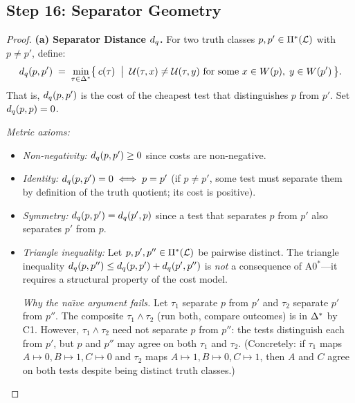 
\subsection{Step 16: Separator Geometry}\label{app:step16}

\begin{proof}
\textbf{(a) Separator Distance $d_q$.}
For two truth classes $p, p' \in \Pi^*(\mathcal{L})$ with $p \neq p'$, define:
\[
  d_q(p, p') \;=\; \min_{\tau \in \Delta^*}
    \bigl\{\, c(\tau) \;\bigm|\; \mathcal{U}(\tau, x) \neq \mathcal{U}(\tau, y)
      \text{ for some } x \in W(p),\; y \in W(p') \,\bigr\}.
\]
That is, $d_q(p, p')$ is the cost of the cheapest test that
distinguishes $p$ from $p'$.  Set $d_q(p, p) = 0$.

\emph{Metric axioms:}
\begin{itemize}[nosep]
  \item \emph{Non-negativity:} $d_q(p, p') \geq 0$ since costs are
        non-negative.
  \item \emph{Identity:} $d_q(p, p') = 0 \iff p = p'$ (if $p \neq p'$,
        some test must separate them by definition of the truth quotient;
        its cost is positive).
  \item \emph{Symmetry:} $d_q(p, p') = d_q(p', p)$ since a test
        that separates $p$ from $p'$ also separates $p'$ from $p$.
  \item \emph{Triangle inequality:} Let $p, p', p'' \in \Pi^*(\mathcal{L})$ be
        pairwise distinct.  The triangle inequality
        $d_q(p, p'') \leq d_q(p, p') + d_q(p', p'')$
        is \emph{not} a consequence of A0$^*$---it requires a structural
        property of the cost model.

        \emph{Why the na\"{\i}ve argument fails.}  Let $\tau_1$ separate
        $p$ from $p'$ and $\tau_2$ separate $p'$ from $p''$.  The composite
        $\tau_1 \wedge \tau_2$ (run both, compare outcomes) is in $\Delta^*$
        by C1.  However, $\tau_1 \wedge \tau_2$ need not separate $p$ from
        $p''$: the tests distinguish each from $p'$, but $p$ and $p''$ may
        agree on both $\tau_1$ and $\tau_2$.  (Concretely: if $\tau_1$ maps
        $A \mapsto 0, B \mapsto 1, C \mapsto 0$ and $\tau_2$ maps
        $A \mapsto 1, B \mapsto 0, C \mapsto 1$, then $A$ and $C$ agree on
        both tests despite being distinct truth classes.)


\end{itemize}
\end{proof}
